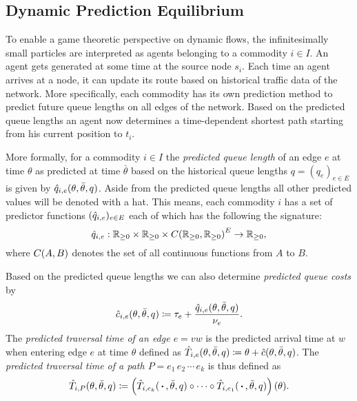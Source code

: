 \subsection{Dynamic Prediction Equilibrium}\label{subsec-dynamic-prediction-equilibrium}

To enable a game theoretic perspective on dynamic flows, the infinitesimally small particles are interpreted as agents belonging to a commodity $i\in I$.
An agent gets generated at some time at the source node $s_i$.
Each time an agent arrives at a node, it can update its route based on historical traffic data of the network.
More specifically, each commodity has its own prediction method to predict future queue lengths on all edges of the network.
Based on the predicted queue lengths an agent now determines a time-dependent shortest path starting from his current position to $t_i$.

More formally, for a commodity $i\in I$ the \emph{predicted queue length} of an edge $e$ at time $\theta$ as predicted at time $\bar\theta$ based on the historical queue lengths $q=(q_e)_{e\in E}$ is given by $\hat q_{i,e}(\theta, \bar\theta, q)$.
Aside from the predicted queue lengths all other predicted values will be denoted with a hat. 
This means, each commodity $i$ has a set of predictor functions $(\hat q_{i,e})_{e\in E}$ each of which has the following the signature:
\[
    \hat q_{i,e} : \mathbb{R}_{\geq 0} \times \mathbb{R}_{\geq 0} \times {C}{\left({\mathbb{R}_{\geq 0}},{\mathbb{R}_{\geq 0}}\right)}^E \rightarrow \mathbb{R}_{\geq0},
\]
where ${C}{\left({A},{B}\right)}$ denotes the set of all continuous functions from $A$ to $B$.

Based on the predicted queue lengths we can also determine \emph{predicted queue costs} by \[
    \hat c_{i,e}(\theta, \bar\theta, q) \coloneqq \tau_e + \frac{\hat q_{i,e}(\theta, \bar\theta, q)}{\nu_e}.
\]
The \emph{predicted traversal time of an edge $e=vw$} is the predicted arrival time at $w$ when entering edge $e$ at time $\theta$ defined as $\hat T_{i,e}(\theta, \bar\theta, q) \coloneqq \theta + \hat c(\theta, \bar\theta, q)$.
The \emph{predicted traversal time of a path $P=e_1\,e_2\,\cdots\,e_k$} is thus defined as \[
    \hat T_{i,P}(\theta,\bar\theta, q) \coloneqq \left(
        \hat T_{i,e_k}(\,\boldsymbol{\cdot}\,, \bar\theta, q) \circ \cdots \circ \hat T_{i,e_1}(\,\boldsymbol{\cdot}\,, \bar\theta, q)
    \right) (\theta).
\]

